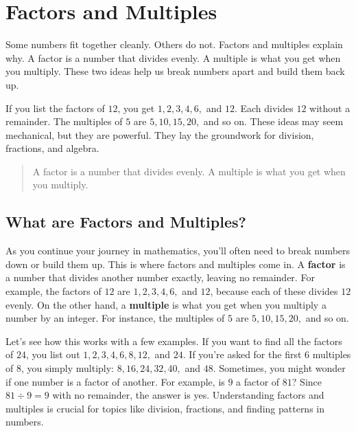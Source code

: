 \cleardoublepage

\section{Factors and Multiples}

Some numbers fit together cleanly. Others do not. Factors and multiples explain
why. A factor is a number that divides evenly. A multiple is what you get when
you multiply. These two ideas help us break numbers apart and build them back up.

If you list the factors of \(12\), you get \(1, 2, 3, 4, 6,\) and \(12\). Each
divides \(12\) without a remainder. The multiples of \(5\) are \(5, 10, 15, 20,\)
and so on. These ideas may seem mechanical, but they are powerful. They lay the
groundwork for division, fractions, and algebra.

\blockquote{A factor is a number that divides evenly. 
A multiple is what you get when you multiply.}

\subsection{What are Factors and Multiples?}

As you continue your journey in mathematics, you'll often need to break numbers
down or build them up. This is where factors and multiples come in. A
\textbf{factor} is a number that divides another number exactly, leaving no
remainder. For example, the factors of \(12\) are \(1, 2, 3, 4, 6,\) and \(12\),
because each of these divides \(12\) evenly. On the other hand, a
\textbf{multiple} is what you get when you multiply a number by an integer. For
instance, the multiples of \(5\) are \(5, 10, 15, 20,\) and so on.

Let's see how this works with a few examples. If you want to find all the
factors of \(24\), you list out \(1, 2, 3, 4, 6, 8, 12,\) and \(24\). If you're
asked for the first \(6\) multiples of \(8\), you simply multiply: \(8, 16, 24,
32, 40,\) and \(48\). Sometimes, you might wonder if one number is a factor of
another. For example, is \(9\) a factor of \(81\)? Since \(81 \div 9 = 9\) with
no remainder, the answer is yes. Understanding factors and multiples is crucial
for topics like division, fractions, and finding patterns in numbers.



% 
% 
% 